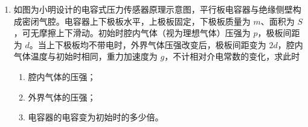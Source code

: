 \documentclass[\gkver]{gaokaozhenti}
\begin{document}
\begin{enumerate}
{（2）A、B 两端直接连接时，电流随热电偶的电动势减小。由闭合回路欧姆定律，衔铁刚要释放时的电动势为

$E = Ir = 0.020 \times 142 \times 10^{-3} \UV = 2.84 \UmV$。

图线在约 $15 \Us$ 时达到最高点，此时停止加热。应在下降段找出电动势降至 $2.84 \UmV$ 的时刻，再减去停止加热的时刻。公开稿的读图标线如下。


公开稿取释放时刻为 $32.5 \Us$，算得 $\Delta t = (32.5 - 15) \Us = 17.5 \Us$。图中水平标线约在 $0$ 与 $10 \UmV$ 的中间，高于题设所对应的 $2.84 \UmV$。释放时刻仍待原卷核实。
}

\item
如图为小明设计的电容式压力传感器原理示意图，平行板电容器与绝缘侧壁构成密闭气腔。电容器上下极板水平，上极板固定，下极板质量为 $m$、面积为 $S$，可无摩擦上下滑动。初始时腔内气体（视为理想气体）压强为 $p$，极板间距为 $d$。当上下极板均不带电时，外界气体压强改变后，极板间距变为 $2d$，腔内气体温度与初始时相同，重力加速度为 $g$，不计相对介电常数的变化，求此时
\begin{enumerate}
	\item
	腔内气体的压强；
	\item
	外界气体的压强；
	\item
	电容器的电容变为初始时的多少倍。
\end{enumerate}


\end{enumerate}
\end{document}
